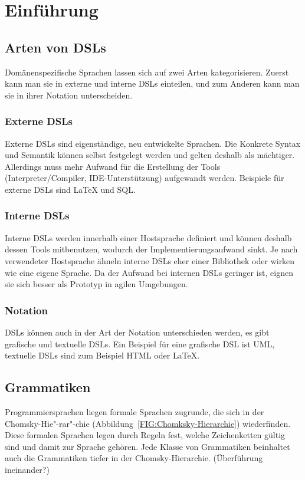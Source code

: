 \documentclass[../InterneDSLs.tex]{subfiles}
\begin{document}
\section{Einführung}

\subsection{Arten von DSLs}
Domänenspezifische Sprachen lassen sich auf zwei Arten kategorisieren. Zuerst kann man sie in externe und interne DSLs einteilen, und zum Anderen kann man sie in ihrer Notation unterscheiden.

\subsubsection{Externe DSLs}
Externe DSLs sind eigenständige, neu entwickelte Sprachen. Die \gls{Konkrete Syntax} und Semantik können selbst festgelegt werden und gelten deshalb als mächtiger. Allerdings muss mehr Aufwand für die Erstellung der Tools (Interpreter/Compiler, \acs{IDE}-Unterstützung) aufgewandt werden. Beispiele für externe DSLs sind LaTeX und SQL.

\subsubsection{Interne DSLs}
Interne DSLs werden innerhalb einer Hostsprache definiert und können deshalb dessen Tools mitbenutzen, wodurch der Implementierungsaufwand sinkt. Je nach verwendeter Hostsprache ähneln interne DSLs eher einer Bibliothek oder wirken wie eine eigene Sprache. Da der Aufwand bei internen DSLs geringer ist, eignen sie sich besser als Prototyp in agilen Umgebungen.~\cite{butting2018deriving}

\subsubsection{Notation}
DSLs können auch in der Art der Notation unterschieden werden, es gibt grafische und textuelle DSLs. Ein Beispiel für eine grafische DSL ist UML, textuelle DSLs sind zum Beispiel HTML oder LaTeX.


\subsection{Grammatiken}
Programmiersprachen liegen formale Sprachen zugrunde, die sich in der Chomsky-Hie"-rar"-chie (Abbildung~\ref{FIG:Chomksky-Hierarchie}) wiederfinden. Diese formalen Sprachen legen durch Regeln fest, welche Zeichenketten gültig sind und damit zur Sprache gehören. Jede Klasse von Grammatiken beinhaltet auch die Grammatiken tiefer in der Chomsky-Hierarchie. (Überführung ineinander?)
\end{document}
